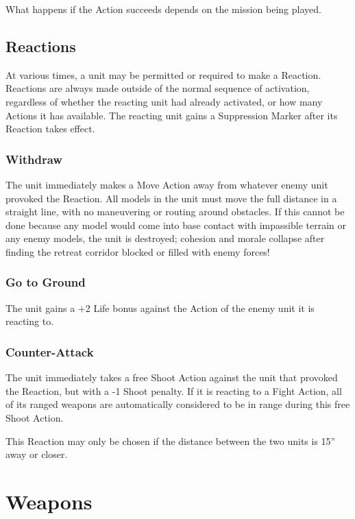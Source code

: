 \begin{multicols}{2}
What happens if the Action succeeds depends on the mission being played.




\section*{Reactions}
At various times, a unit may be permitted or required to make a Reaction. Reactions are always made outside of the normal sequence of activation, regardless of whether the reacting unit had already activated, or how many Actions it has available. The reacting unit gains a Suppression Marker after its Reaction takes effect.



\subsection*{Withdraw}
The unit immediately makes a Move Action away from whatever enemy unit provoked the Reaction. All models in the unit must move the full distance in a straight line, with no maneuvering or routing around obstacles. If this cannot be done because any model would come into base contact with impassible terrain or any enemy models, the unit is destroyed; cohesion and morale collapse after finding the retreat corridor blocked or filled with enemy forces!



\subsection*{Go to Ground}
The unit gains a +2 Life bonus against the Action of the enemy unit it is reacting to.



\subsection*{Counter-Attack}
The unit immediately takes a free Shoot Action against the unit that provoked the Reaction, but with a -1 Shoot penalty. If it is reacting to a Fight Action, all of its ranged weapons are automatically considered to be in range during this free Shoot Action.

This Reaction may only be chosen if the distance between the two units is 15'' away or closer.




\chapter{Weapons}


\end{multicols}
